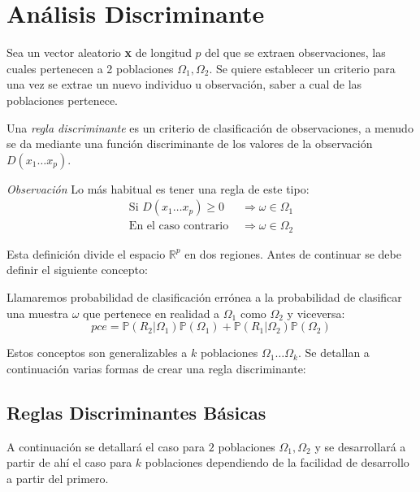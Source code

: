 \newpage
\section{Análisis Discriminante}
\noindent Sea un vector aleatorio \textbf{x} de longitud $p$ del que se extraen observaciones, las cuales pertenecen a 2 poblaciones $\Omega_1,\Omega_2$. Se quiere establecer un criterio para una vez se extrae un nuevo individuo u observación, saber a cual de las poblaciones pertenece.\\


\begin{defi}
Una \textit{regla discriminante} es un criterio de clasificación de observaciones, a menudo se da mediante una función discriminante de los valores de la observación $D(x_1 \ldots x_p)$. 
\end{defi}

\noindent \emph{Observación} Lo más habitual es tener una regla de este tipo:
\begin{equation}
\begin{split}
\text{Si } D(x_1 \ldots x_p)\geq 0 &\Rightarrow \omega\in \Omega_1\\ 
\text{En el caso contrario } &\Rightarrow \omega\in \Omega_2
\end{split}
\end{equation}

\noindent Esta definición divide el espacio $\mathbb{R}^p$ en dos regiones. Antes de continuar se debe definir el siguiente concepto:
\begin{defi}
Llamaremos probabilidad de clasificación errónea a la probabilidad de clasificar una muestra $\omega$ que pertenece en realidad a $\Omega_1$ como $\Omega_2$ y viceversa:
\begin{equation}
pce=\mathbb{P}(R_2|\Omega_1)\mathbb{P}(\Omega_1)+\mathbb{P}(R_1|\Omega_2)\mathbb{P}(\Omega_2)
\end{equation}
\end{defi}

\noindent Estos conceptos son generalizables a $k$ poblaciones $\Omega_1 \ldots \Omega_k$. 
Se detallan a continuación varias formas de crear una regla discriminante: 
\subsection{Reglas Discriminantes Básicas}
\noindent A continuación se detallará el caso para $2$ poblaciones $\Omega_1, \Omega_2$ y se desarrollará a partir de ahí el caso para $k$ poblaciones dependiendo de la facilidad de desarrollo a partir del primero. 
